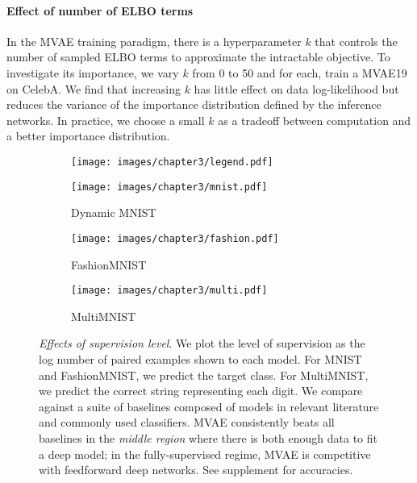 \paragraph{Effect of number of ELBO terms} In the MVAE training paradigm, there is a hyperparameter $k$ that controls the number of sampled ELBO terms to approximate the intractable objective. To investigate its importance, we vary $k$ from 0 to 50 and for each, train a MVAE19 on CelebA. We find that increasing $k$ has little effect on data log-likelihood but reduces the variance of the importance distribution defined by the inference networks. In practice, we choose a small $k$ as a tradeoff between computation and a better importance distribution. 

\begin{figure}
\centering
  \begin{subfigure}[b]{\linewidth}
    \centering
    \texttt{[image: images/chapter3/legend.pdf]}
  \end{subfigure}
  \begin{subfigure}[b]{.32\linewidth}
    \centering
    \texttt{[image: images/chapter3/mnist.pdf]}
    \caption{Dynamic MNIST}
  \end{subfigure}
  \begin{subfigure}[b]{.32\linewidth}
    \centering
    \texttt{[image: images/chapter3/fashion.pdf]}
    \caption{FashionMNIST}
  \end{subfigure}
  \begin{subfigure}[b]{.32\linewidth}
    \centering
    \texttt{[image: images/chapter3/multi.pdf]}
    \caption{MultiMNIST}
  \end{subfigure}
  \caption{\textit{Effects of supervision level}. We plot the level of supervision as the log number of paired examples shown to each model. For MNIST and FashionMNIST, we predict the target class. For MultiMNIST, we predict the correct string representing each digit. We compare against a suite of baselines composed of models in relevant literature and commonly used classifiers. MVAE consistently beats all baselines in the \textit{middle region} where there is both enough data to fit a deep model; in the fully-supervised regime, MVAE is competitive with feedforward deep networks. See supplement for accuracies.}
  \label{fig:weaksup_prediction}
\end{figure}


